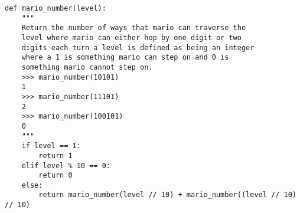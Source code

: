 \begin{blocksection}
\begin{solution}
\begin{lstlisting}
def mario_number(level):
    """
    Return the number of ways that mario can traverse the
    level where mario can either hop by one digit or two
    digits each turn a level is defined as being an integer
    where a 1 is something mario can step on and 0 is 
    something mario cannot step on. 
    >>> mario_number(10101)
    1
    >>> mario_number(11101)
    2   
    >>> mario_number(100101)
    0
    """
    if level == 1:
        return 1
    elif level % 10 == 0:
        return 0
    else:
        return mario_number(level // 10) + mario_number((level // 10) // 10)
\end{lstlisting}
\end{solution}
\end{blocksection}


